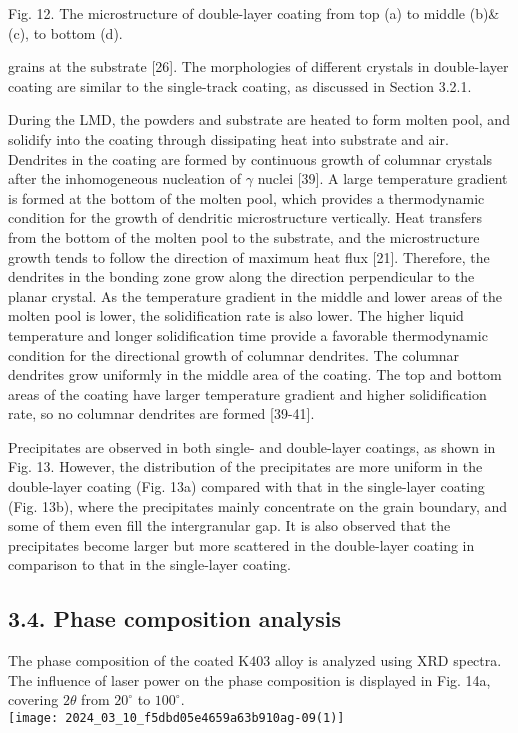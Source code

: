 \documentclass[10pt]{article}
\begin{document}
Fig. 12. The microstructure of double-layer coating from top (a) to middle (b)\&(c), to bottom (d).

grains at the substrate [26]. The morphologies of different crystals in double-layer coating are similar to the single-track coating, as discussed in Section 3.2.1.

During the LMD, the powders and substrate are heated to form molten pool, and solidify into the coating through dissipating heat into substrate and air. Dendrites in the coating are formed by continuous growth of columnar crystals after the inhomogeneous nucleation of $\gamma$ nuclei [39]. A large temperature gradient is formed at the bottom of the molten pool, which provides a thermodynamic condition for the growth of dendritic microstructure vertically. Heat transfers from the bottom of the molten pool to the substrate, and the microstructure growth tends to follow the direction of maximum heat flux [21]. Therefore, the dendrites in the bonding zone grow along the direction perpendicular to the planar crystal. As the temperature gradient in the middle and lower areas of the molten pool is lower, the solidification rate is also lower. The higher liquid temperature and longer solidification time provide a favorable thermodynamic condition for the directional growth of columnar dendrites. The columnar dendrites grow uniformly in the middle area of the coating. The top and bottom areas of the coating have larger temperature gradient and higher solidification rate, so no columnar dendrites are formed [39-41].

Precipitates are observed in both single- and double-layer coatings, as shown in Fig. 13. However, the distribution of the precipitates are more uniform in the double-layer coating (Fig. 13a) compared with that in the single-layer coating (Fig. 13b), where the precipitates mainly concentrate on the grain boundary, and some of them even fill the intergranular gap. It is also observed that the precipitates become larger but more scattered in the double-layer coating in comparison to that in the single-layer coating.

\subsection*{3.4. Phase composition analysis}
The phase composition of the coated $\mathrm{K} 403$ alloy is analyzed using XRD spectra. The influence of laser power on the phase composition is displayed in Fig. 14a, covering $2 \theta$ from $20^{\circ}$ to $100^{\circ}$.\\
\texttt{[image: 2024\_03\_10\_f5dbd05e4659a63b910ag-09(1)]}
\end{document}
